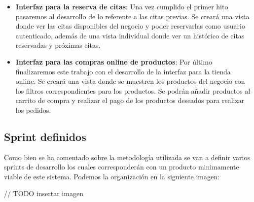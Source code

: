 \begin{itemize}
\begin{itemize}
                \item \textbf{Interfaz para la reserva de citas}: Una vez cumplido el primer hito pasaremos al
                desarrollo de lo referente a las citas previas. Se creará una vista donde ver las citas disponibles del
                negocio y poder reservarlas como usuario autenticado, además de una vista individual donde ver
                un histórico de citas reservadas y próximas citas.

                \item \textbf{Interfaz para las compras online de productos}: Por último finalizaremos este trabajo con
                el desarrollo de la interfaz para la tienda online. Se creará una vista donde se muestren los productos
                del negocio con los filtros correspondientes para los productos. Se podrán añadir productos al carrito
                de compra y realizar el pago de los productos deseados para realizar los pedidos.

            \end{itemize}
\end{itemize}
\subsection{Sprint definidos}
Como bien se ha comentado sobre la metodología utilizada se van a definir varios sprints de desarrollo los cuales corresponderán con un producto minimamente viable de este sistema. Podemos la organización en la siguiente imagen:

// TODO insertar imagen
